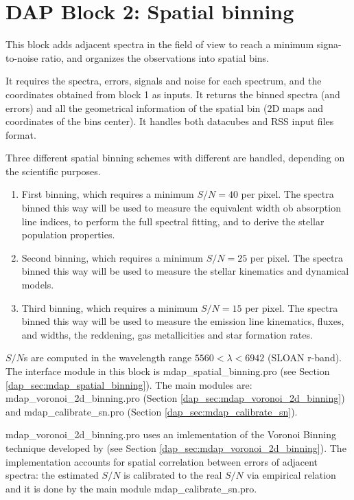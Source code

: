 \documentclass[11pt]{book}
\begin{document}




\section{DAP Block 2: Spatial binning}

This block adds adjacent spectra in the field of view to reach a
minimum signa-to-noise ratio, and organizes the observations into
spatial bins. 

It requires the spectra, errors, signals and noise for each spectrum,
and the coordinates obtained from block 1 as inputs. It returns the
binned spectra (and errors) and all the geometrical information of the
spatial bin (2D maps and coordinates of the bins center). It handles
both datacubes and RSS input files format.

Three different spatial binning schemes with different
are handled, depending on the scientific purposes.


\begin{enumerate}

\item First binning, which requires a minimum $S/N = 40$ per
  pixel. The spectra binned this way will be used to measure the
  equivalent width ob absorption line indices, to perform the full
  spectral fitting, and to derive the stellar population properties.

\item Second binning, which requires a minimum $S/N = 25$ per
  pixel. The spectra binned this way will be used to measure the
  stellar kinematics and dynamical models.


\item Third binning, which requires a minimum $S/N = 15$ per
  pixel. The spectra binned this way will be used to measure the
  emission line kinematics, fluxes, and widths, the reddening, gas
  metallicities and star formation rates.

\end{enumerate}

 $S/N$s are computed in the wavelength range $5560 < \lambda < 6942$
(SLOAN r-band).  The interface module in this block is
mdap\_spatial\_binning.pro (see Section
\ref{dap_sec:mdap_spatial_binning}). The main modules are:
mdap\_voronoi\_2d\_binning.pro (Section
\ref{dap_sec:mdap_voronoi_2d_binning}) and mdap\_calibrate\_sn.pro
(Section \ref{dap_sec:mdap_calibrate_sn}).


mdap\_voronoi\_2d\_binning.pro uses an imlementation of the Voronoi
Binning technique developed by \citet{Cappellari+03} (see Section
\ref{dap_sec:mdap_voronoi_2d_binning}). The implementation accounts
for spatial correlation between errors of adjacent spectra: the
estimated $S/N$ is calibrated to the real $S/N$ via empirical relation
and it is done by the main module mdap\_calibrate\_sn.pro.
\end{document}
